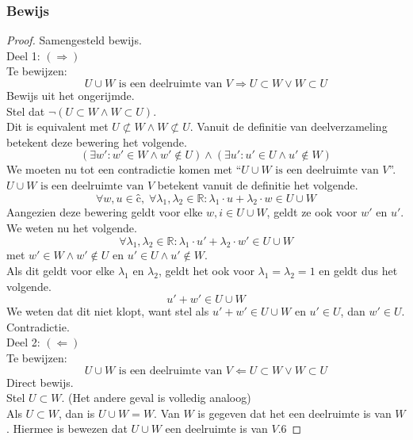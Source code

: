\documentclass[lineaire_algebra_oplossingen.tex]{subfiles}
\begin{document}
\subsubsection*{Bewijs}
\begin{proof} Samengesteld bewijs.
\\Deel 1: $(\Rightarrow)$
\\ Te bewijzen:
\[
U \cup W \text{ is een deelruimte van }V \Rightarrow U \subset W \vee W \subset U
\]
Bewijs uit het ongerijmde.
\\Stel dat $\neg(U \subset W \wedge W \subset U)$.
\\Dit is equivalent met $U \not\subset W \wedge W \not\subset U$.
Vanuit de definitie van deelverzameling betekent deze bewering het volgende.
\[
(\exists w': w' \in W \wedge w' \not\in U) \wedge (\exists u': u' \in U \wedge u' \not\in W) 
\]
We moeten nu tot een contradictie komen met ``$U\cup W \text{ is een deelruimte van }V$''.
$U\cup W \text{ is een deelruimte van }V$ betekent vanuit de definitie het volgende.
\[
\forall w, u \in ĉ,\; \forall \lambda_1 , \lambda_2 \in \mathbb{R}: \lambda_1\cdot u + \lambda_2\cdot w \in U\cup W
\]
Aangezien deze bewering geldt voor elke $w,i \in U\cup W$, geldt ze ook voor $w'$ en $u'$.
We weten nu het volgende.
\[
\forall \lambda_1 , \lambda_2 \in \mathbb{R}: \lambda_1\cdot u' + \lambda_2\cdot w' \in U\cup W
\]
met $w' \in W \wedge w' \not\in U$ en $u' \in U \wedge u' \not\in W$.\\
Als dit geldt voor elke $\lambda_1$ en $\lambda_2$, geldt het ook voor $\lambda_1= \lambda_2 = 1$ en geldt dus het volgende.
\[
u' + w' \in U \cup W
\]
We weten dat dit niet klopt, want stel als $u' + w' \in U \cup W$ en $u' \in U$, dan $w' \in U$. Contradictie.
\\Deel 2: $(\Leftarrow)$
\\ Te bewijzen:
\[
U \cup W \text{ is een deelruimte van }V \Leftarrow U \subset W \vee W \subset U
\]
Direct bewijs.\\
Stel $U \subset W$. (Het andere geval is volledig analoog)\\
Als $U \subset W$, dan is $U\cup W = W$. Van $W$ is gegeven dat het een deelruimte is van $W$. Hiermee is bewezen dat $U\cup W$ een deelruimte is van $V$.6
\end{proof}
\end{document}
